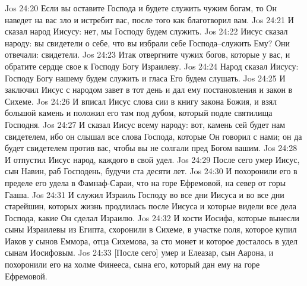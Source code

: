 Jos 24:20  Если вы оставите Господа и будете служить чужим богам, то Он наведет на вас зло и истребит вас, после того как благотворил вам.
Jos 24:21  И сказал народ Иисусу: нет, мы Господу будем служить.
Jos 24:22  Иисус сказал народу: вы свидетели о себе, что вы избрали себе Господа--служить Ему? Они отвечали: свидетели.
Jos 24:23  Итак отвергните чужих богов, которые у вас, и обратите сердце свое к Господу Богу Израилеву.
Jos 24:24  Народ сказал Иисусу: Господу Богу нашему будем служить и гласа Его будем слушать.
Jos 24:25  И заключил Иисус с народом завет в тот день и дал ему постановления и закон в Сихеме.
Jos 24:26  И вписал Иисус слова сии в книгу закона Божия, и взял большой камень и положил его там под дубом, который подле святилища Господня.
Jos 24:27  И сказал Иисус всему народу: вот, камень сей будет нам свидетелем, ибо он слышал все слова Господа, которые Он говорил с нами; он да будет свидетелем против вас, чтобы вы не солгали пред Богом вашим.
Jos 24:28  И отпустил Иисус народ, каждого в свой удел.
Jos 24:29  После сего умер Иисус, сын Навин, раб Господень, будучи ста десяти лет.
Jos 24:30  И похоронили его в пределе его удела в Фамнаф-Сараи, что на горе Ефремовой, на север от горы Гааша.
Jos 24:31  И служил Израиль Господу во все дни Иисуса и во все дни старейшин, которых жизнь продлилась после Иисуса и которые видели все дела Господа, какие Он сделал Израилю.
Jos 24:32  И кости Иосифа, которые вынесли сыны Израилевы из Египта, схоронили в Сихеме, в участке поля, которое купил Иаков у сынов Еммора, отца Сихемова, за сто монет и которое досталось в удел сынам Иосифовым.
Jos 24:33  [После сего] умер и Елеазар, сын Аарона, и похоронили его на холме Финееса, сына его, который дан ему на горе Ефремовой.


